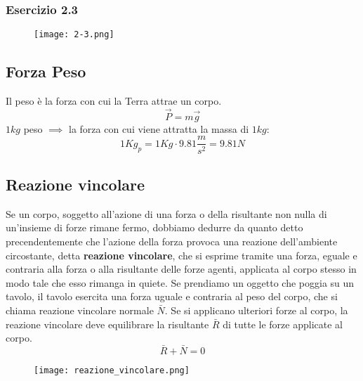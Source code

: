\documentclass[../../main.tex]{subfiles}
\begin{document}
\subsubsection{Esercizio 2.3}
\begin{figure}[H]
    \centering
    \texttt{[image: 2-3.png]}
\end{figure}

\subsection{Forza Peso}
Il peso è la forza con cui la Terra attrae un corpo.
\[
    \vec P = m\vec g
\]
$1kg$ peso $\implies$ la forza con cui viene attratta la massa di $1kg$:
\[
    1Kg_p = 1Kg \cdot 9.81\dfrac{m}{s^2} = 9.81N
\]

\subsection{Reazione vincolare}
\begin{minipage}{0.6\textwidth}
    Se un corpo, soggetto all'azione di una forza o della risultante non nulla di un'insieme di forze rimane fermo, dobbiamo dedurre da quanto detto precendentemente che l'azione della forza provoca una reazione dell'ambiente circostante, detta \textbf{reazione vincolare}, che si esprime tramite una forza, eguale e contraria alla forza o alla risultante delle forze agenti, applicata al corpo stesso in modo tale che esso rimanga in quiete. Se prendiamo un oggetto che poggia su un tavolo, il tavolo esercita una forza uguale e contraria al peso del corpo, che si chiama reazione vincolare normale $\bar N$. Se si applicano ulteriori forze al corpo, la reazione vincolare deve equilibrare la risultante $\bar R$ di tutte le forze applicate al corpo.
    \[
        \bar R + \bar N = 0
    \]
\end{minipage}
\begin{minipage}{0.4\textwidth}
    \centering
    \begin{figure}[H]
        \centering
        \texttt{[image: reazione\_vincolare.png]}
    \end{figure}
\end{minipage}
\end{document}

